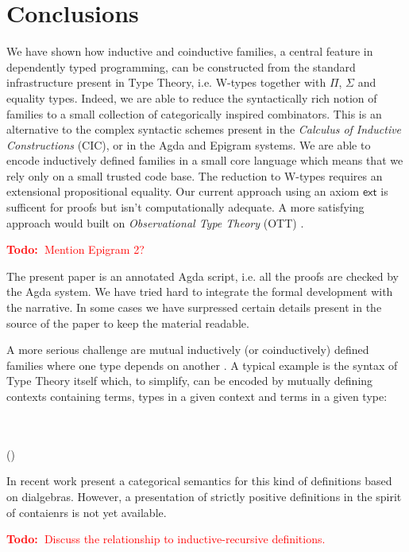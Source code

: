 \documentclass[a4paper]{article}
\newcommand{\todo}[1]{\textcolor{red}{\textbf{Todo:~}#1}}
\newcommand{\Conid}[1]{\mathit{#1}}
\newcommand{\Varid}[1]{\mathit{#1}}
\def\resethooks{%
  \global\let\SaveRestoreHook\empty
  \global\let\ColumnHook\empty}
\let\hspre\empty
\let\hspost\empty
\renewcommand\Varid[1]{\mathord{\textsf{#1}}}
\let\Conid\Varid
\begin{document}
\section{Conclusions}

We have shown how inductive and coinductive families, a central
feature in dependently typed programming, can be constructed from the
standard infrastructure present in Type Theory, i.e. W-types together
with $\Pi$, $\Sigma$ and equality types. Indeed, we are able to reduce
the syntactically rich notion of families to a small collection of
categorically inspired combinators. This is an alternative to the
complex syntactic schemes present in the \emph{Calculus of Inductive
  Constructions} (CIC), or in the Agda and Epigram systems. We are
able to encode inductively defined families in a small core language
which means that we rely only on a small trusted code base. The
reduction to W-types requires an extensional propositional
equality. Our current approach using an axiom \ensuremath{\Varid{ext}} is sufficent for
proofs but isn't computationally adequate. A more satisfying approach
would built on \emph{Observational Type Theory} (OTT)
\cite{alti:ott-conf}.

\todo{Mention Epigram 2?}

The present paper is an annotated Agda script, i.e. all the proofs are
checked by the Agda system. We have tried hard to integrate the formal
development with the narrative. In some cases we have surpressed
certain details present in the source of the paper to keep the
material readable.

A more serious challenge are mutual inductively (or coinductively)
defined families where one type depends on another
\cite{forsberg2010inductive}. A typical example is the syntax of Type
Theory itself which, to simplify, can be encoded by mutually defining
contexts containing terms, types in a given context and terms in a
given type:
\begin{hscode}\SaveRestoreHook
\column{B}{@{}>{\hspre}l<{\hspost}@{}}%
\column{E}{@{}>{\hspre}l<{\hspost}@{}}%
\>[B]{}\Conid{Con}\;\in\;\Conid{Set}{}\<[E]%
\\
\>[B]{}\Conid{Ty}\;\in\;\Conid{Con}\;\rightarrow\;\Conid{Set}{}\<[E]%
\\
\>[B]{}\Conid{Tm}\;\in\;(\Gamma\;\in\;\Conid{Con})\;\rightarrow\;\Conid{Ty}\;\Gamma\;\rightarrow\;\Conid{Set}{}\<[E]%
\ColumnHook
\end{hscode}\resethooks
In recent work \cite{txa:catind2} present a categorical semantics for
this kind of definitions based on dialgebras. However, a presentation
of strictly positive definitions in the spirit of contaienrs is not
yet available.

\todo{Discuss the relationship to inductive-recursive definitions.}



\end{document}
